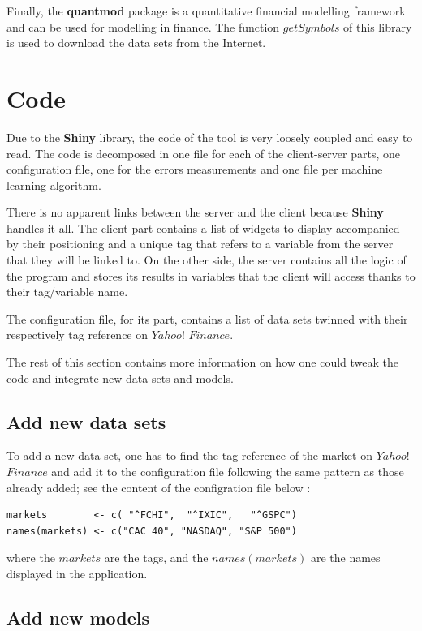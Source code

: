 \documentclass[11pt,a4paper,oneside]{book}
\begin{document}
Finally, the \textbf{quantmod} \cite{quantmod} package is a quantitative financial modelling framework and can be used for modelling in finance. The function $getSymbols$ of this library is used to download the data sets from the Internet.


\section{Code}

Due to the \textbf{Shiny} library, the code of the tool is very loosely coupled and easy to read. The code is decomposed in one file for each of the client-server parts, one configuration file, one for the errors measurements and one file per machine learning algorithm. 

There is no apparent links between the server and the client because \textbf{Shiny} handles it all. The client part contains a list of widgets to display accompanied by their positioning and a unique tag that refers to a variable from the server that they will be linked to. On the other side, the server contains all the logic of the program and stores its results in variables that the client will access thanks to their tag/variable name.

The configuration file, for its part, contains a list of data sets twinned with their respectively tag reference on $Yahoo!$ $Finance$. 

The rest of this section contains more information on how one could tweak the code and integrate new data sets and models.


\subsection{Add new data sets}

To add a new data set, one has to find the tag reference of the market on $Yahoo!$ $Finance$ and add it to the configuration file following the same pattern as those already added; see the content of the configration file below : 


\begin{lstlisting}
markets        <- c( "^FCHI",  "^IXIC",   "^GSPC")
names(markets) <- c("CAC 40", "NASDAQ", "S&P 500")
\end{lstlisting}

where the $markets$ are the tags, and the $names(markets)$ are the names displayed in the application.


\subsection{Add new models}
\end{document}
